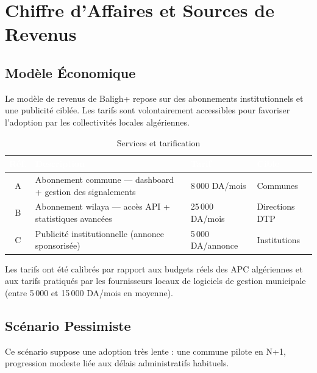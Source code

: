 \documentclass[12pt,a4paper]{report}
\newcommand{\thdcell}[1]{%
  \cellcolor{tabhead}\textbf{\textcolor{white}{#1}}%
}
\begin{document}
\section{Chiffre d'Affaires et Sources de Revenus}

\subsection{Modèle Économique}

Le modèle de revenus de Baligh+ repose sur des abonnements institutionnels et
une publicité ciblée. Les tarifs sont volontairement accessibles pour favoriser
l'adoption par les collectivités locales algériennes.

\begin{table}[H]
  \centering
  \caption{Services et tarification}
  \renewcommand{\arraystretch}{1.4}
  \begin{tabularx}{\linewidth}{clXl}
    \toprule
    \rowcolor{primary}
    \thdcell{Réf.} & \thdcell{Description} & \thdcell{Tarif} &
    \thdcell{Cible} \\
    \midrule

    A & Abonnement commune — dashboard + gestion des signalements &
      8\,000 DA/mois & Communes \\

    \rowcolor{lightgray}
    B & Abonnement wilaya — accès API + statistiques avancées &
      25\,000 DA/mois & Directions DTP \\

    C & Publicité institutionnelle (annonce sponsorisée) &
      5\,000 DA/annonce & Institutions \\

    \bottomrule
  \end{tabularx}
\end{table}

\begin{notebox}
  Les tarifs ont été calibrés par rapport aux budgets réels des APC algériennes
  et aux tarifs pratiqués par les fournisseurs locaux de logiciels de gestion
  municipale (entre 5\,000 et 15\,000 DA/mois en moyenne).
\end{notebox}

\subsection{Scénario Pessimiste}

Ce scénario suppose une adoption très lente : une commune pilote en N+1,
progression modeste liée aux délais administratifs habituels.
\end{document}
